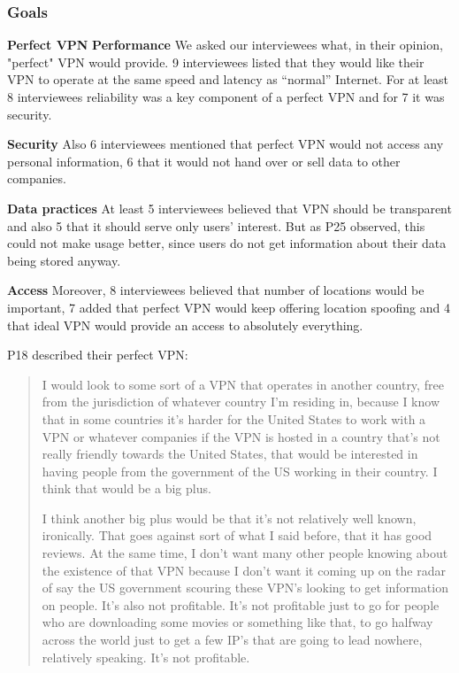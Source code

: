 \subsubsection{Goals}



\textbf{Perfect VPN}
\textbf{Performance} We asked our interviewees what, in their opinion, "perfect" VPN would provide. 9 interviewees listed that they would like their VPN to operate at the same speed and latency as  “normal” Internet. For at least 8 interviewees reliability was a key component of a perfect VPN and for 7 it was security. 

\textbf{Security} Also 6 interviewees mentioned that perfect VPN would not access any personal information, 6 that it would not hand over or sell data to other companies. 

\textbf{Data practices} At least 5 interviewees believed that VPN should be transparent and also 5 that it should serve only users' interest. But as P25 observed, this could not make usage better, since users do not get information about their data being stored anyway.


\textbf{Access} Moreover, 8 interviewees believed that number of locations would be important, 7 added that perfect VPN would keep offering location spoofing and 4 that ideal VPN would provide an access to absolutely everything.

P18 described their perfect VPN:
\begin{quote}I would look to some sort of a VPN that operates in another country, free from the jurisdiction of whatever country I'm residing in, because I know that in some countries it's harder for the United States to work with a VPN or whatever companies if the VPN is hosted in a country that's not really friendly towards the United States, that would be interested in having people from the government of the US working in their country. I think that would be a big plus.


I think another big plus would be that it's not relatively well known, ironically. That goes against sort of what I said before, that it has good reviews. At the same time, I don't want many other people knowing about the existence of that VPN because I don't want it coming up on the radar of say the US government scouring these VPN's looking to get information on people. It's also not profitable. It's not profitable just to go for people who are downloading some movies or something like that, to go halfway across the world just to get a few IP's that are going to lead nowhere, relatively speaking. It's not profitable.\end{quote}


